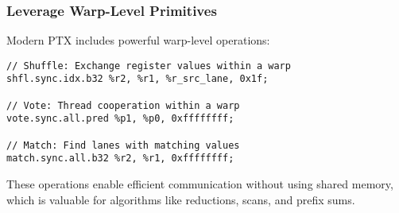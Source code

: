 \subsubsection{Leverage Warp-Level Primitives}

Modern PTX includes powerful warp-level operations:

\begin{lstlisting}[style=ptx]
// Shuffle: Exchange register values within a warp
shfl.sync.idx.b32 %r2, %r1, %r_src_lane, 0x1f;

// Vote: Thread cooperation within a warp
vote.sync.all.pred %p1, %p0, 0xffffffff;

// Match: Find lanes with matching values
match.sync.all.b32 %r2, %r1, 0xffffffff;
\end{lstlisting}

These operations enable efficient communication without using shared memory, which is valuable for algorithms like reductions, scans, and prefix sums.

